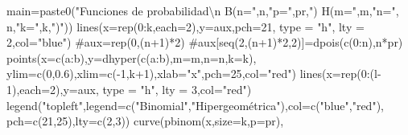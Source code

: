 \documentclass[
  letterpaper,
  DIV=11,
  numbers=noendperiod]{scrreprt}
\newenvironment{Shaded}{\begin{snugshade}}{\end{snugshade}}
\newcommand{\AttributeTok}[1]{\textcolor[rgb]{0.40,0.45,0.13}{#1}}
\newcommand{\CommentTok}[1]{\textcolor[rgb]{0.37,0.37,0.37}{#1}}
\newcommand{\DecValTok}[1]{\textcolor[rgb]{0.68,0.00,0.00}{#1}}
\newcommand{\FloatTok}[1]{\textcolor[rgb]{0.68,0.00,0.00}{#1}}
\newcommand{\FunctionTok}[1]{\textcolor[rgb]{0.28,0.35,0.67}{#1}}
\newcommand{\NormalTok}[1]{\textcolor[rgb]{0.00,0.23,0.31}{#1}}
\newcommand{\SpecialCharTok}[1]{\textcolor[rgb]{0.37,0.37,0.37}{#1}}
\newcommand{\StringTok}[1]{\textcolor[rgb]{0.13,0.47,0.30}{#1}}
\begin{document}
\begin{Shaded}
\begin{Highlighting}[]
       \AttributeTok{main=}\FunctionTok{paste0}\NormalTok{(}\StringTok{"Funciones de probabilidad}\SpecialCharTok{\textbackslash{}n}\StringTok{ B(n="}\NormalTok{,n,}\StringTok{"p="}\NormalTok{,pr,}\StringTok{")  }
\StringTok{                   H(m="}\NormalTok{,m,}\StringTok{"n="}\NormalTok{, n,}\StringTok{"k="}\NormalTok{,k,}\StringTok{")"}\NormalTok{))}
  \FunctionTok{lines}\NormalTok{(}\AttributeTok{x=}\FunctionTok{rep}\NormalTok{(}\DecValTok{0}\SpecialCharTok{:}\NormalTok{k,}\AttributeTok{each=}\DecValTok{2}\NormalTok{),}\AttributeTok{y=}\NormalTok{aux,}\AttributeTok{pch=}\DecValTok{21}\NormalTok{, }\AttributeTok{type =} \StringTok{"h"}\NormalTok{, }\AttributeTok{lty =} \DecValTok{2}\NormalTok{,}\AttributeTok{col=}\StringTok{"blue"}\NormalTok{)}
  \CommentTok{\#aux=rep(0,(n+1)*2)}
  \CommentTok{\#aux[seq(2,(n+1)*2,2)]=dpois(c(0:n),n*pr)}
  \FunctionTok{points}\NormalTok{(}\AttributeTok{x=}\FunctionTok{c}\NormalTok{(a}\SpecialCharTok{:}\NormalTok{b),}\AttributeTok{y=}\FunctionTok{dhyper}\NormalTok{(}\FunctionTok{c}\NormalTok{(a}\SpecialCharTok{:}\NormalTok{b),}\AttributeTok{m=}\NormalTok{m,}\AttributeTok{n=}\NormalTok{n,}\AttributeTok{k=}\NormalTok{k),}
         \AttributeTok{ylim=}\FunctionTok{c}\NormalTok{(}\DecValTok{0}\NormalTok{,}\FloatTok{0.6}\NormalTok{),}\AttributeTok{xlim=}\FunctionTok{c}\NormalTok{(}\SpecialCharTok{{-}}\DecValTok{1}\NormalTok{,k}\SpecialCharTok{+}\DecValTok{1}\NormalTok{),}\AttributeTok{xlab=}\StringTok{"x"}\NormalTok{,}\AttributeTok{pch=}\DecValTok{25}\NormalTok{,}\AttributeTok{col=}\StringTok{"red"}\NormalTok{)}
  \FunctionTok{lines}\NormalTok{(}\AttributeTok{x=}\FunctionTok{rep}\NormalTok{(}\DecValTok{0}\SpecialCharTok{:}\NormalTok{(l}\DecValTok{{-}1}\NormalTok{),}\AttributeTok{each=}\DecValTok{2}\NormalTok{),}\AttributeTok{y=}\NormalTok{aux, }\AttributeTok{type =} \StringTok{"h"}\NormalTok{, }\AttributeTok{lty =} \DecValTok{3}\NormalTok{,}\AttributeTok{col=}\StringTok{"red"}\NormalTok{)}
  \FunctionTok{legend}\NormalTok{(}\StringTok{"topleft"}\NormalTok{,}\AttributeTok{legend=}\FunctionTok{c}\NormalTok{(}\StringTok{"Binomial"}\NormalTok{,}\StringTok{"Hipergeométrica"}\NormalTok{),}\AttributeTok{col=}\FunctionTok{c}\NormalTok{(}\StringTok{"blue"}\NormalTok{,}\StringTok{"red"}\NormalTok{),}
         \AttributeTok{pch=}\FunctionTok{c}\NormalTok{(}\DecValTok{21}\NormalTok{,}\DecValTok{25}\NormalTok{),}\AttributeTok{lty=}\FunctionTok{c}\NormalTok{(}\DecValTok{2}\NormalTok{,}\DecValTok{3}\NormalTok{))}
  \FunctionTok{curve}\NormalTok{(}\FunctionTok{pbinom}\NormalTok{(x,}\AttributeTok{size=}\NormalTok{k,}\AttributeTok{p=}\NormalTok{pr),}

\end{Highlighting}
\end{Shaded}
\end{document}

